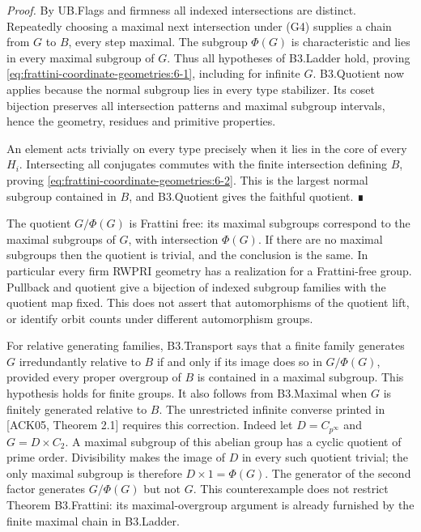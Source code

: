 \emph{Proof.} By UB.Flags and firmness all indexed intersections are distinct. Repeatedly choosing a maximal next intersection under (G4) supplies a chain from \(G\) to \(B\), every step maximal. The subgroup \(\Phi(G)\) is characteristic and lies in every maximal subgroup of \(G\). Thus all hypotheses of B3.Ladder hold, proving \eqref{eq:frattini-coordinate-geometries:6-1}, including for infinite \(G\). B3.Quotient now applies because the normal subgroup lies in every type stabilizer. Its coset bijection preserves all intersection patterns and maximal subgroup intervals, hence the geometry, residues and primitive properties.

An element acts trivially on every type precisely when it lies in the core of every \(H_i\). Intersecting all conjugates commutes with the finite intersection defining \(B\), proving \eqref{eq:frattini-coordinate-geometries:6-2}. This is the largest normal subgroup contained in \(B\), and B3.Quotient gives the faithful quotient. ∎

The quotient \(G/\Phi(G)\) is Frattini free: its maximal subgroups correspond to the maximal subgroups of \(G\), with intersection \(\Phi(G)\). If there are no maximal subgroups then the quotient is trivial, and the conclusion is the same. In particular every firm RWPRI geometry has a realization for a Frattini-free group. Pullback and quotient give a bijection of indexed subgroup families with the quotient map fixed. This does not assert that automorphisms of the quotient lift, or identify orbit counts under different automorphism groups.

For relative generating families, B3.Transport says that a finite family generates \(G\) irredundantly relative to \(B\) if and only if its image does so in \(G/\Phi(G)\), provided every proper overgroup of \(B\) is contained in a maximal subgroup. This hypothesis holds for finite groups. It also follows from B3.Maximal when \(G\) is finitely generated relative to \(B\). The unrestricted infinite converse printed in {[}ACK05, Theorem 2.1{]} requires this correction. Indeed let \(D=C_{p^\infty}\) and \(G=D\times C_2\). A maximal subgroup of this abelian group has a cyclic quotient of prime order. Divisibility makes the image of \(D\) in every such quotient trivial; the only maximal subgroup is therefore \(D\times1=\Phi(G)\). The generator of the second factor generates \(G/\Phi(G)\) but not \(G\). This counterexample does not restrict Theorem B3.Frattini: its maximal-overgroup argument is already furnished by the finite maximal chain in B3.Ladder.

